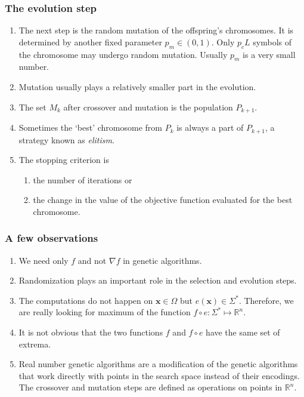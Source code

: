 \documentclass{beamer}
\begin{document}
\begin{frame}
\frametitle{The evolution step}
\begin{enumerate}
\item The next step is the random mutation of the offspring's chromosomes. It is
determined by another fixed parameter $p_m \in (0, 1)$. Only $p_cL$ symbols of 
the chromosome may undergo random mutation. Usually $p_m$ is a very small 
number.
\item Mutation usually plays a relatively smaller part in the evolution.
\item The set $M_k$ after crossover and mutation is the population $P_{k+1}$.
\item Sometimes the `best' chromosome from $P_k$ is always a part of $P_{k+1}$,
a strategy known as \emph{elitism}.
\item The stopping criterion is 
\begin{enumerate}
\item the number of iterations or
\item the change in the value of the objective function evaluated for the best
chromosome.
\end{enumerate}
\end{enumerate}
\end{frame}

\begin{frame}
\frametitle{A few observations}
\begin{enumerate}
\item We need only $f$ and not $\nabla f$ in genetic algorithms.
\item Randomization plays an important role in the selection and evolution steps.
\item The computations do not happen on $\bm{x} \in \Omega$ but $e(\bm{x}) \in
\Sigma^\ast$. Therefore, we are really looking for maximum of the function $f
\circ e: \Sigma^\ast \mapsto \mathbb{R}^n$.
\item It is not obvious that the two functions $f$ and $f \circ e$ have the same
set of extrema.
\item Real number genetic algorithms are a modification of the genetic 
algorithms that work directly with points in the search space instead of their 
encodings. The crossover and mutation steps are defined as operations on points
in $\mathbb{R}^n$.
\end{enumerate}
\end{frame}
\end{document}
